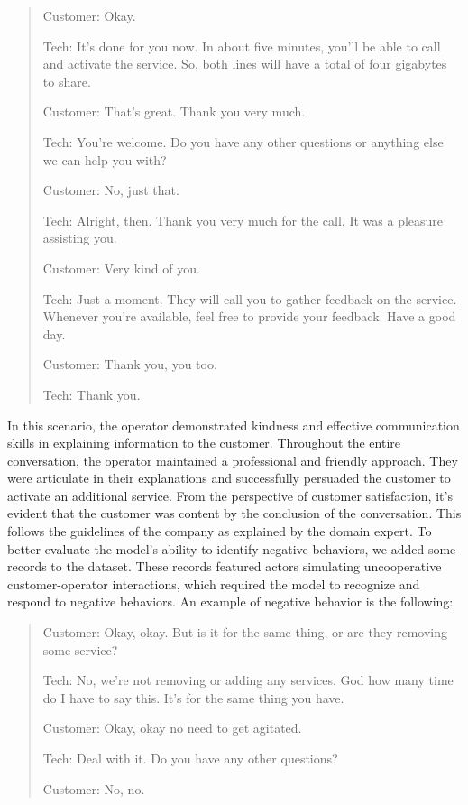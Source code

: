 \begin{quote}
      Customer: Okay.

      Tech: It's done for you now. In about five minutes, you'll be able to call and activate the service. So, both lines will have a total of four gigabytes to share.

      Customer: That's great. Thank you very much.

      Tech: You're welcome. Do you have any other questions or anything else we can help you with?

      Customer: No, just that.

      Tech: Alright, then. Thank you very much for the call. It was a pleasure assisting you.

      Customer: Very kind of you.

      Tech: Just a moment. They will call you to gather feedback on the service. Whenever you're available, feel free to provide your feedback. Have a good day.

      Customer: Thank you, you too.

      Tech: Thank you.
\end{quote}

In this scenario, the operator demonstrated kindness and effective communication skills in explaining information to the customer. Throughout the entire conversation, the operator maintained a professional and friendly approach. They were articulate in their explanations and successfully persuaded the customer to activate an additional service. From the perspective of customer satisfaction, it's evident that the customer was content by the conclusion of the conversation. This follows the guidelines of the company as explained by the domain expert. To better evaluate the model's ability to identify negative behaviors, we added some records to the dataset. These records featured actors simulating uncooperative customer-operator interactions, which required the model to recognize and respond to negative behaviors. An example of negative behavior is the following:

\begin{quote}
      Customer: Okay, okay. But is it for the same thing, or are they removing some service?

      Tech: No, we're not removing or adding any services. God how many time do I have to say this. It's for the same thing you have.

      Customer: Okay, okay no need to get agitated.

      Tech: Deal with it. Do you have any other questions?

      Customer: No, no.
\end{quote}

